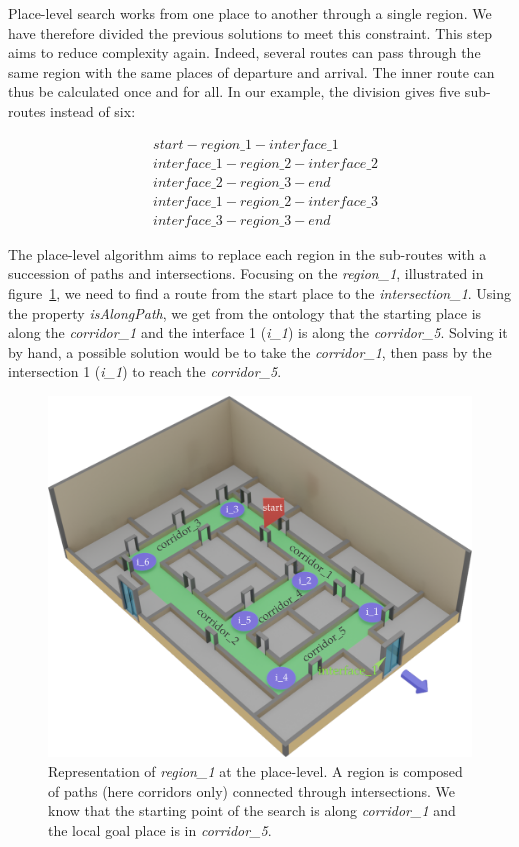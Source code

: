 Place-level search works from one place to another through a single region. We have therefore divided the previous solutions to meet this constraint. This step aims to reduce complexity again. Indeed, several routes can pass through the same region with the same places of departure and arrival. The inner route can thus be calculated once and for all. In our example, the division gives five sub-routes instead of six:

\begin{align*}
&start - region\_1 - interface\_1 \\
&interface\_1 - region\_2 - interface\_2 \\
&interface\_2 - region\_3 - end \\
&interface\_1 - region\_2 - interface\_3 \\
&interface\_3 - region\_3 - end
\end{align*}

The place-level algorithm aims to replace each region in the sub-routes with a succession of paths and intersections. Focusing on the \textit{region\_1}, illustrated in figure~\ref{fig:chap3_region1}, we need to find a route from the start place to the \textit{intersection\_1}. Using the property \textit{isAlongPath}, we get from the ontology that the starting place is along the \textit{corridor\_1} and the interface 1 (\textit{i\_1}) is along the \textit{corridor\_5}. Solving it by hand, a possible solution would be to take the \textit{corridor\_1}, then pass by the intersection 1 (\textit{i\_1}) to reach the \textit{corridor\_5}.

\begin{figure}[ht!]
\centering
\includegraphics[scale=0.28]{figures/chapter3/region1.png}
\caption{\label{fig:chap3_region1} Representation of \textit{region\_1} at the place-level. A region is composed of paths (here corridors only) connected through intersections. We know that the starting point of the search is along \textit{corridor\_1} and the local goal place is in \textit{corridor\_5}. }
\end{figure}


